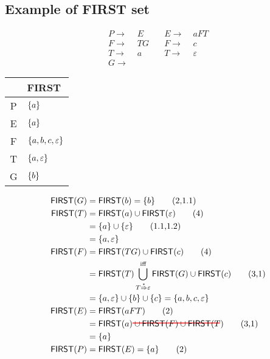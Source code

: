 \documentclass[10pt,a4paper,landscape]{article}
\begin{document}
\begin{multicols*}{3}
\section*{Example of FIRST set}
\begin{minipage}{.5\linewidth}
  \begin{align*}
    P \to &\; E \quad  &E \to &\; aFT  \\
    F \to &\; TG\quad  &F \to &\; c    \\
    T \to &\; a \quad  &T \to &\; \varepsilon  \\
    G \to &\
  \end{align*}
\end{minipage}
\begin{minipage}{.5\linewidth}
  \begin{tabular}{c|l}
    & \textsf{FIRST} \\
    \hline
    P &  $\{a\}$\\
    \hline
    E &  $\{a\}$\\
    \hline
    F &  $\{a,b,c,\varepsilon\}$\\
    \hline
    T & $\{a,\varepsilon\}$ \\
    \hline
    G & $\{b\}$ \\
    \hline
  \end{tabular}
\end{minipage}
\begin{align*}
  \mathsf{FIRST}(G) &= \mathsf{FIRST}(b) = \mset{b} \tag{2,1.1} \\
  \mathsf{FIRST}(T) &= \mathsf{FIRST}(a) \cup \mathsf{FIRST}(\varepsilon) \tag{4}\\
                    &= \mset{a} \cup \mset{\varepsilon} \tag{1.1,1.2} \\
                    &= \mset{a,\varepsilon} \\
  \mathsf{FIRST}(F) &= \mathsf{FIRST}(TG) \cup \mathsf{FIRST}(c) \tag{4} \\
                    &= \mathsf{FIRST}(T) \bigcup_{T\overset{*}{\Rightarrow}\varepsilon}^{\text{iff}} \mathsf{FIRST}(G) \cup \mathsf{FIRST}(c) \tag{3,1} \\
                    &= \mset{a,\varepsilon} \cup \mset{b} \cup \mset{c} = \mset{a,b,c,\varepsilon} \\
  \mathsf{FIRST}(E) &= \mathsf{FIRST}(aFT) \tag{2} \\
                    &= \mathsf{FIRST}(a) \hcancel{\cup \mathsf{FIRST}(F) \cup \mathsf{FIRST}(T)} \tag{3,1} \\
                    &= \mset{a} \\
  \mathsf{FIRST}(P) &= \mathsf{FIRST}(E) = \mset{a} \tag{2}
\end{align*}


\end{multicols*}
\end{document}
